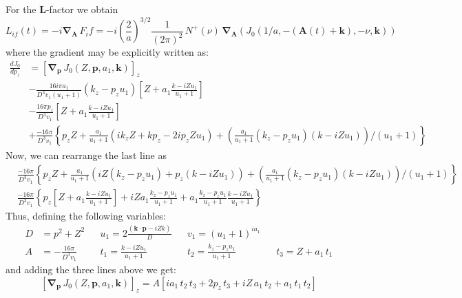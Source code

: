 For the $\bm{L}$-factor we obtain
\begin{equation}
  L_{if}(t) = -i \bm{\nabla}_{\bm{A}} \,F_if = -i \left(\frac{2}{a}\right)^{3/2} \frac{1}{(2 \pi)^{2}} \,N^{+}(\nu) \, \bm{\nabla}_{\bm{A}} \left( J_{0}(1/a, -(\bm{A}(t)+\bm{k}), -\nu, \bm{k}) \right)
\end{equation}
where the gradient may be explicitly written as:
%
\begin{align*}
\frac{d J_{0}}{d p_{z}} &= \left[ \bm{\nabla}_{\bm{p}} \,J_{0}(Z, \bm{p}, a_{1}, \bm{k}) \right]_{z} \\
&-\frac{16  i \pi a_{1}}{D^{3} v_{1} (u_{1}+1)} (k_{z}- p_{z} u_{1})\left[Z + a_{1} \frac{k - i Z u_{1}}{u_{1}+1} \right]
\\
&-\frac{16 \pi p_{z} }{D^{3} v_{1}}  \left[Z + a_{1} \frac{k - i Z u_{1}}{u_{1}+1} \right]
\\
&+ \frac{-16 \pi}{D^{3} v_{1}} \left\{  p_{z} Z + \frac{a_{1}}{u_{1}+1} (i k_{z} Z +  k p_{z} - 2 i p_{z} Z u_{1})  + (\frac{a_{1}}{u_{1}+1} (k_{z} - p_{z} u_{1}) ( k- i Z u_{1}))/(u_{1}+1) \right\} 
\end{align*}
Now, we can rearrange the last line as
\begin{align*}
& \frac{-16 \pi}{D^{3} v_{1}} \left\{  p_{z} Z + \frac{a_{1}}{u_{1}+1} \left( i Z (k_{z} - p_{z} u_{1}) +  p_{z} (k- i Z u_{1})  \right)  + (\frac{a_{1}}{u_{1}+1} (k_{z} - p_{z} u_{1}) ( k- i Z u_{1}))/(u_{1}+1) \right\} \\
& \frac{-16 \pi}{D^{3} v_{1}} \left\{  p_{z}  \left[Z + a_{1} \frac{k - i Z u_{1}}{u_{1}+1} \right] +  i Z a_{1} \frac{k_{z} - p_{z} u_{1}}{u_{1}+1} + a_{1} \frac{k_{z} - p_{z} u_{1}}{u_{1}+1}\frac{ k- i Z u_{1}}{u_{1}+1} \right\} 
  \end{align*}
Thus, defining the following variables:
\begin{subequations}
  \begin{align}
    D&= p^{2}+ Z^{2}   &&  u_{1}=2 \frac{\left( \bm{k} \cdot \bm{p} - i Z k \right)}{D} &&  v_{1}=(u_{1}+1)^{i a_{1}} \\
    A&= -\frac{16 \pi}{D^{3} v_{1}} && t_{1}=\frac{ k- i Z u_{1}}{u_{1}+1} &&
    t_{2}=\frac{k_{z} - p_{z} u_{1}}{u_{1}+1} && t_{3}= Z + a_{1}\,t_{1}
  \end{align}
\end{subequations}
and adding the three lines above we get:
\begin{equation} \label{Q:grad-J0-z}
  \left[ \bm{\nabla}_{\bm{p}} \,J_{0}(Z, \bm{p}, a_{1}, \bm{k}) \right]_{z} = A \left[ i a_{1}\, t_{2}\, t_{3} + 2 p_{z}\,t_{3} + i Z \, a_{1}\, t_{2} + a_{1}\, t_{1}\, t_{2} \right]
\end{equation}




